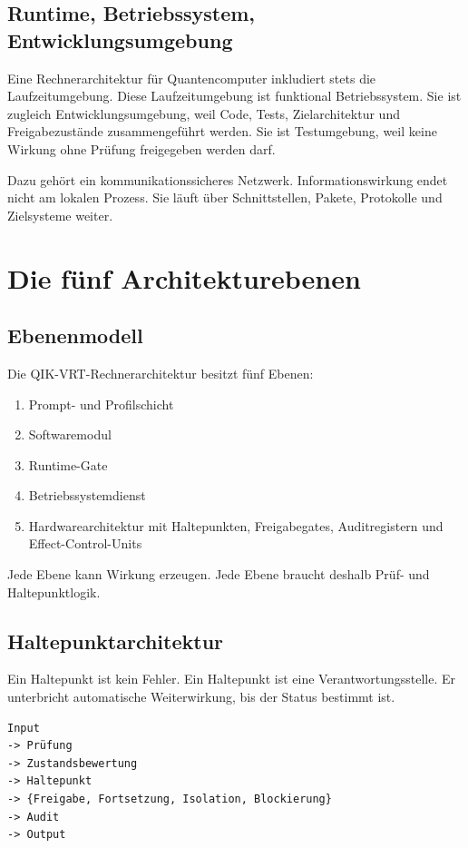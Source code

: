 \documentclass[11pt,a4paper,oneside]{book}
\begin{document}
\section{Runtime, Betriebssystem, Entwicklungsumgebung}

Eine Rechnerarchitektur für Quantencomputer inkludiert stets die Laufzeitumgebung. Diese Laufzeitumgebung ist funktional Betriebssystem. Sie ist zugleich Entwicklungsumgebung, weil Code, Tests, Zielarchitektur und Freigabezustände zusammengeführt werden. Sie ist Testumgebung, weil keine Wirkung ohne Prüfung freigegeben werden darf.

Dazu gehört ein kommunikationssicheres Netzwerk. Informationswirkung endet nicht am lokalen Prozess. Sie läuft über Schnittstellen, Pakete, Protokolle und Zielsysteme weiter.

\chapter{Die fünf Architekturebenen}

\section{Ebenenmodell}

Die QIK-VRT-Rechnerarchitektur besitzt fünf Ebenen:

\begin{enumerate}
\item Prompt- und Profilschicht
\item Softwaremodul
\item Runtime-Gate
\item Betriebssystemdienst
\item Hardwarearchitektur mit Haltepunkten, Freigabegates, Auditregistern und Effect-Control-Units
\end{enumerate}

Jede Ebene kann Wirkung erzeugen. Jede Ebene braucht deshalb Prüf- und Haltepunktlogik.

\section{Haltepunktarchitektur}

Ein Haltepunkt ist kein Fehler. Ein Haltepunkt ist eine Verantwortungsstelle. Er unterbricht automatische Weiterwirkung, bis der Status bestimmt ist.

\begin{lstlisting}
Input
-> Prüfung
-> Zustandsbewertung
-> Haltepunkt
-> {Freigabe, Fortsetzung, Isolation, Blockierung}
-> Audit
-> Output
\end{lstlisting}
\end{document}
